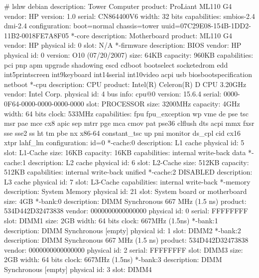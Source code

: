 \documentclass[mingoth,a4paper]{jsarticle}
\begin{document}
\begin{commandline}
# lshw 
debian
    description: Tower Computer
    product: ProLiant ML110 G4
    vendor: HP
    version: 1.0
    serial: CN864400V6
    width: 32 bits
    capabilities: smbios-2.4 dmi-2.4
    configuration: boot=normal chassis=tower uuid=07C29E08-154B-1DD2-11B2-0018FE7A8F05
  *-core
       description: Motherboard
       product: ML110 G4
       vendor: HP
       physical id: 0
       slot: N/A
     *-firmware
          description: BIOS
          vendor: HP
          physical id: 0
          version: O10 (07/20/2007)
          size: 64KB
          capacity: 960KB
          capabilities: pci pnp apm upgrade shadowing escd cdboot bootselect socketedrom edd int5printscreen int9keyboard int14serial int10video acpi usb biosbootspecification netboot
     *-cpu
          description: CPU
          product: Intel(R) Celeron(R) D CPU 3.20GHz
          vendor: Intel Corp.
          physical id: 4
          bus info: cpu@0
          version: 15.6.4
          serial: 0000-0F64-0000-0000-0000-0000
          slot: PROCESSOR
          size: 3200MHz
          capacity: 4GHz
          width: 64 bits
          clock: 533MHz
          capabilities: fpu fpu_exception wp vme de pse tsc msr pae mce cx8 apic sep mtrr pge mca cmov pat pse36 clflush dts acpi mmx fxsr sse sse2 ss ht tm pbe nx x86-64 constant_tsc up pni monitor ds_cpl cid cx16 xtpr lahf_lm
          configuration: id=0
        *-cache:0
             description: L1 cache
             physical id: 5
             slot: L1-Cache
             size: 16KB
             capacity: 16KB
             capabilities: internal write-back data
        *-cache:1
             description: L2 cache
             physical id: 6
             slot: L2-Cache
             size: 512KB
             capacity: 512KB
             capabilities: internal write-back unified
        *-cache:2 DISABLED
             description: L3 cache
             physical id: 7
             slot: L3-Cache
             capabilities: internal write-back
     *-memory
          description: System Memory
          physical id: 21
          slot: System board or motherboard
          size: 4GB
        *-bank:0
             description: DIMM Synchronous 667 MHz (1.5 ns)
             product: 534D442D32473838
             vendor: 0000000000000000
             physical id: 0
             serial: FFFFFFFF
             slot: DIMM1
             size: 2GB
             width: 64 bits
             clock: 667MHz (1.5ns)
        *-bank:1
             description: DIMM Synchronous [empty]
             physical id: 1
             slot: DIMM2
        *-bank:2
             description: DIMM Synchronous 667 MHz (1.5 ns)
             product: 534D442D32473838
             vendor: 0000000000000000
             physical id: 2
             serial: FFFFFFFF
             slot: DIMM3
             size: 2GB
             width: 64 bits
             clock: 667MHz (1.5ns)
        *-bank:3
             description: DIMM Synchronous [empty]
             physical id: 3
             slot: DIMM4
\end{commandline}
\end{document}
